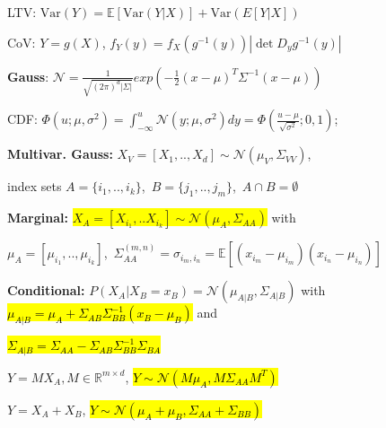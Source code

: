 \documentclass[11pt,landscape,a4paper,fleqn]{article}
\newcommand{\mhl}[1]{\setlength{\fboxsep}{0pt}\colorbox{yellow}{#1}}
\begin{document}
\begin{multicols*}{4}






LTV: $\text{Var}(Y)=\mathbb{E}[\text{Var}(Y|X)]+ \text{Var}(E[Y|X]) $


CoV: $Y = g(X)$, $f_Y(y) = f_X(g^{-1}(y))  |\det D_y g^{-1}(y)|$

\textbf{Gauss}: \mbox{\fontsize{10}{6}\selectfont $\mathcal{N} = \frac{1}{\sqrt{(2\pi)^d |\Sigma|}}exp(-\frac{1}{2}(x-\mu)^T\Sigma^{-1} (x-\mu))$}

CDF: \mbox{\fontsize{9}{6}\selectfont $\Phi(u;\mu,\sigma^2) = \int_{-\infty}^{u}\mathcal{N}(y;\mu,\sigma^2)dy=\Phi(\frac{u-\mu}{\sqrt{\sigma^2}};0,1)$;}

\textbf{Multivar. Gauss:}
\mbox{\fontsize{10}{6}\selectfont $X_V = [X_1, .., X_d] \sim \mathcal{N}(\mu_V, \Sigma_{VV})$},

index sets \mbox{\fontsize{9}{6}\selectfont $A = \{i_1,..,i_k\}$, $B = \{j_1,..,j_m\}$, $A \cap B = \emptyset$}

\textbf{Marginal:} \mhl{$X_A = [X_{i_1},..X_{i_k}] \sim \mathcal{N}(\mu_A, \Sigma_{AA})$} with

\mbox{\fontsize{8.8}{6}\selectfont $\mu_A = [\mu_{i_1},..,\mu_{i_k}]$, $\Sigma_{AA}^{(m,n)} = \sigma_{i_m,i_n} = \mathbb{E}[(x_{i_m} - \mu_{i_m}) (x_{i_n} - \mu_{i_n})]$}

\textbf{Conditional:} $P(X_A | X_B = x_B) = \mathcal{N}(\mu_{A|B}, \Sigma_{A|B})$ with \hl{$\mu_{A|B} = \mu_A + \Sigma_{AB} \Sigma_{BB}^{-1} (x_B - \mu_B)$} and 

\hl{$\Sigma_{A|B} = \Sigma_{AA} - \Sigma_{AB} \Sigma_{BB}^{-1} \Sigma_{BA}$}

$Y = M X_A, M \in \mathbb{R}^{m \times d}$, \hl{$Y \sim \mathcal{N}(M\mu_A, M\Sigma_{AA}M^T)$}

$Y = X_A + X_B$, \hl{$Y \sim \mathcal{N}(\mu_A + \mu_B, \Sigma_{AA} + \Sigma_{BB})$}



\end{multicols*}
\end{document}
